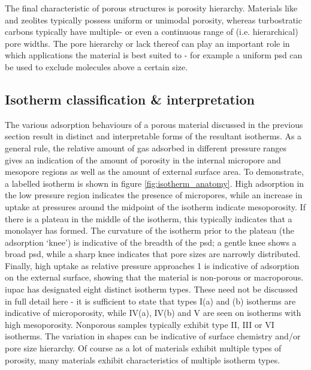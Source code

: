 The final characteristic of porous structures is porosity hierarchy. Materials like  and zeolites typically possess uniform or unimodal porosity,\citep{WeitkampZeolites, Siriwardane2005Adsorption, Ding2019Carbon, lin2009hydrogen} whereas \glspl{turbostratic carbon} typically have multiple- or even a continuous range of (i.e. hierarchical) pore widths.\citep{Li2020Hierarchical, Sevilla2014Energy, Xia2008Hierarchical, Balahmar2017Biomass} The pore hierarchy or lack thereof can play an important role in which applications the material is best suited to - for example a uniform \acrfull{psd} can be used to exclude molecules above a certain size.\citep{qian2020mof, reid2001adsorption, Adeniran2014family}

\subsection{Isotherm classification \& interpretation}
\label{ss:iso_interpretation}

The various adsorption behaviours of a porous material discussed in the previous section result in distinct and interpretable forms of the resultant isotherms. As a general rule, the relative amount of gas adsorbed in different pressure ranges gives an indication of the amount of porosity in the internal \gls{micropore} and \gls{mesopore} regions as well as the amount of external surface area. To demonstrate, a labelled isotherm is shown in figure \ref{fig:isotherm_anatomy}. High adsorption in the low pressure region indicates the presence of \glspl{micropore}, while an increase in uptake at pressures around the midpoint of the isotherm indicate mesoporosity. If there is a plateau in the middle of the isotherm, this typically indicates that a monolayer has formed. The curvature of the isotherm prior to the plateau (the adsorption `knee') is indicative of the breadth of the \acrshort{psd}; a gentle knee shows a broad \acrshort{psd}, while a sharp knee indicates that pore sizes are narrowly distributed. Finally, high uptake as relative pressure approaches 1 is indicative of adsorption on the external surface, showing that the material is non-porous or macroporous.\citep{Thommes2015Physisorption} \acrshort{iupac} has designated eight distinct isotherm types.\citep{Thommes2015Physisorption, Sing1985} These need not be discussed in full detail here - it is sufficient to state that types I(a) and (b) isotherms are indicative of microporosity, while IV(a), IV(b) and V are seen on isotherms with high mesoporosity. Nonporous samples typically exhibit type II, III or VI isotherms. The variation in shapes can be indicative of surface chemistry and/or pore size hierarchy.\citep{thommes2014physical, monson2012understanding} Of course as a lot of materials exhibit multiple types of porosity, many materials exhibit characteristics of multiple isotherm types.\citep{Thommes2015Physisorption} 

